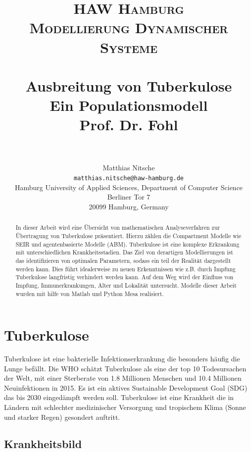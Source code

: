 \documentclass[paper=a4, fontsize=11pt, ngerman, abstract=on]{scrartcl}
\title {
  \normalfont \normalsize
  \textsc{HAW Hamburg} \\ [25pt]
  \textsc{Modellierung Dynamischer Systeme} \\ [15pt]
  \horrule{0.5pt} \\[0.4cm] %
  \huge Ausbreitung von Tuberkulose \\ [15pt] %
  \small Ein Populationsmodell \\ [15pt]
  \small Prof. Dr. Fohl \\
  \horrule{1pt} \\[0.5cm] %
}
\author{
  Matthias Nitsche \\
  \texttt{matthias.nitsche@haw-hamburg.de} \\
  \small{Hamburg University of Applied Sciences, Department of Computer Science} \\
  \small{Berliner Tor 7} \\
  \small{20099 Hamburg, Germany} \\
}
\numberwithin{equation}{section} %
\numberwithin{figure}{section} %
\numberwithin{table}{section} %
\begin{document}
\maketitle

\begin{abstract}
In dieser Arbeit wird eine Übersicht von mathematischen Analyseverfahren zur Übertragung von Tuberkulose präsentiert. Hierzu zählen die Compartment Modelle wie SEIR und agentenbasierte Modelle (ABM). Tuberkulose ist eine komplexe Erkrankung mit unterschiedlichen Krankheitsstadien. Das Ziel von derartigen Modellierungen ist das identifizieren von optimalen Parametern, sodass ein teil der Realität dargestellt werden kann. Dies führt idealerweise zu neuen Erkenntnissen wie z.B. durch Impfung Tuberkulose langfristig verhindert werden kann. Auf dem Weg wird der Einfluss von Impfung, Immunerkrankungen, Alter und Lokalität untersucht. Modelle dieser Arbeit wurden mit hilfe von Matlab und Python Mesa realisiert.
\end{abstract}

\newpage

\renewcommand{\cftsecleader}{\cftdotfill{\cftdotsep}}
\tableofcontents

\newpage


\section{Tuberkulose}

Tuberkulose ist eine bakterielle Infektionserkrankung die besonders häufig die Lunge befällt. Die WHO schätzt Tuberkulose als eine der top 10 Todesursachen der Welt, mit einer Sterberate von 1.8 Millionen Menschen und 10.4 Millionen Neuinfektionen in 2015. Es ist ein aktives Sustainable Development Goal (SDG) das bis 2030 eingedämpft werden soll. Tuberkulose ist eine Krankheit die in Ländern mit schlechter medizinischer Versorgung und tropischem Klima (Sonne und starker Regen) gesondert auftritt. \cite{WHOTB2016}

\subsection{Krankheitsbild}
\end{document}
